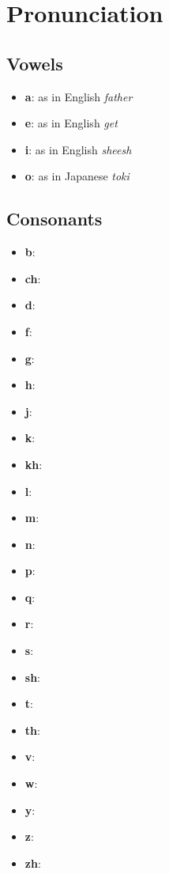 \chapter*{Pronunciation}
\section*{Vowels}
\begin{itemize}
	\item \textbf{a}: as in English \textit{father}
	\item \textbf{e}: as in English \textit{get}
	\item \textbf{i}: as in English \textit{sheesh}
	\item \textbf{o}: as in Japanese \textit{toki}
\end{itemize}
\section*{Consonants}
\begin{itemize}
	\item \textbf{b}:
	\item \textbf{ch}:
	\item \textbf{d}:
	\item \textbf{f}:
	\item \textbf{g}:
	\item \textbf{h}:
	\item \textbf{j}:
	\item \textbf{k}:
	\item \textbf{kh}:
	\item \textbf{l}:
	\item \textbf{m}:
	\item \textbf{n}:
	\item \textbf{p}:
	\item \textbf{q}:
	\item \textbf{r}:
	\item \textbf{s}:
	\item \textbf{sh}:
	\item \textbf{t}:
	\item \textbf{th}:
	\item \textbf{v}:
	\item \textbf{w}:
	\item \textbf{y}:
	\item \textbf{z}:
	\item \textbf{zh}:
\end{itemize}
